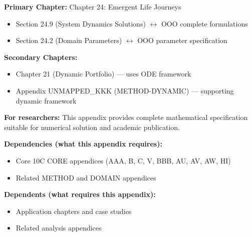 \begin{tcolorbox}[colback=purple!5!white, colframe=purple!75!black, title=Chapter Linkage]

\textbf{Primary Chapter:} Chapter 24: Emergent Life Journeys
\begin{itemize}[nosep]
\item Section 24.9 (System Dynamics Solutions) $\leftrightarrow$ OOO complete formulations
\item Section 24.2 (Domain Parameters) $\leftrightarrow$ OOO parameter specification
\end{itemize}

\textbf{Secondary Chapters:}
\begin{itemize}[nosep]
\item Chapter 21 (Dynamic Portfolio) --- uses ODE framework
\item Appendix UNMAPPED_KKK (METHOD-DYNAMIC) --- supporting dynamic framework
\end{itemize}

\textbf{For researchers:} This appendix provides complete mathematical specification suitable for numerical solution and academic publication.

\end{tcolorbox}


\begin{tcolorbox}[colback=blue!5!white, colframe=blue!75!black,
    title=Cross-Reference Map]

\textbf{Dependencies (what this appendix requires):}
\begin{itemize}[nosep]
    \item Core 10C CORE appendices (AAA, B, C, V, BBB, AU, AV, AW, HI)
    \item Related METHOD and DOMAIN appendices
\end{itemize}

\textbf{Dependents (what requires this appendix):}
\begin{itemize}[nosep]
    \item Application chapters and case studies
    \item Related analysis appendices
\end{itemize}

\end{tcolorbox}



